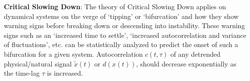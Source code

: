 \textbf{Critical Slowing Down}: The theory of Critical Slowing Down applies on dynamical systems on the verge of `tipping' or `bifurcation' and how they show warning signs before breaking down or descending into instability. These warning signs such as an `increased time to settle', `increased autocorrelation and variance of fluctuations', etc. \cite{schefferEarlyWarningSignalsForCriticalTransitions} can be statistically analyzed to predict the onset of such a bifurcation for a given system.
Autocorrelation $c(t, \tau)$ of any detrended physical/natural signal $\tilde{x}(t)$ or $d(x(t))$, should decrease exponentially as the time-lag $\tau$ is increased.

